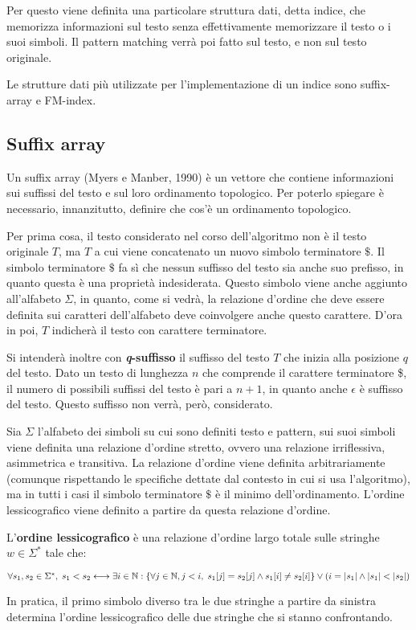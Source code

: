 Per questo viene definita una particolare struttura dati, detta indice, che
memorizza informazioni sul testo senza effettivamente memorizzare il testo o
i suoi simboli.
Il pattern matching verrà poi fatto sul testo, e non sul testo originale.

Le strutture dati più utilizzate per l'implementazione di un indice sono
suffix-array e FM-index.

\subsection{Suffix array}
Un suffix array (Myers e Manber, 1990) è un vettore che contiene informazioni
sui suffissi del testo e sul loro ordinamento topologico.
Per poterlo spiegare è necessario, innanzitutto, definire che cos'è un
ordinamento topologico.

Per prima cosa, il testo considerato nel corso dell'algoritmo non è il testo
originale $T$, ma $T$ a cui viene concatenato un nuovo simbolo terminatore $\$$.
Il simbolo terminatore $\$$ fa sì che nessun suffisso del testo sia anche suo
prefisso, in quanto questa è una proprietà indesiderata.
Questo simbolo viene anche aggiunto all'alfabeto $\Sigma$, in quanto, come si
vedrà, la relazione d'ordine che deve essere definita sui caratteri
dell'alfabeto deve coinvolgere anche questo carattere.
D'ora in poi, $T$ indicherà il testo con carattere terminatore.

Si intenderà inoltre con \textbf{\textit{q}-suffisso} il suffisso del testo
$T$ che inizia alla posizione $q$ del testo.
Dato un testo di lunghezza $n$ che comprende il carattere terminatore \$,
il numero di possibili suffissi del testo è pari a $n+1$,
in quanto anche $\epsilon$ è suffisso del testo. Questo suffisso non verrà,
però, considerato.

Sia $\Sigma$ l'alfabeto dei simboli su cui sono definiti testo e pattern, sui
suoi simboli viene definita una relazione d'ordine stretto, ovvero una relazione
irriflessiva, asimmetrica e transitiva.
La relazione d'ordine viene definita arbitrariamente (comunque rispettando le
specifiche dettate dal contesto in cui si usa l'algoritmo), ma in tutti i casi
il simbolo terminatore $\$$ è il minimo dell'ordinamento.
L'ordine lessicografico viene definito a partire da questa relazione d'ordine.

L'\textbf{ordine lessicografico} è una relazione d'ordine largo totale sulle
stringhe $w \in \Sigma^*$ tale che:
\begin{center}
    $\forall s_1, s_2 \in \Sigma^*, \; s_1 < s_2 \longleftrightarrow
    \exists i \in \mathbb{N} :
    \left\{\forall j \in \mathbb{N}, j<i, \; s_1[j]=s_2[j] \land s_1[i] \neq s_2[i]\right\}
    \lor \left( i = |s_1| \land |s_1| < |s_2| \right)$
\end{center}
In pratica, il primo simbolo diverso tra le due stringhe a partire da sinistra
determina l'ordine lessicografico delle due stringhe che si stanno confrontando.

